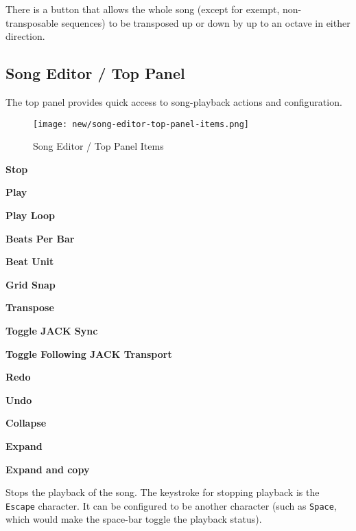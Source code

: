    There is a button that allows the whole song (except for
   exempt, non-transposable sequences) to be transposed up or down by up to an
   octave in either direction.

\subsection{Song Editor / Top Panel}
\label{subsec:seq64_song_editor_top}

   The top panel provides quick access to song-playback actions and
   configuration.

\begin{figure}[H]
   \centering 
   \texttt{[image: new/song-editor-top-panel-items.png]}
   \caption{Song Editor / Top Panel Items}
   \label{fig:song_editor_top_panel_items}
\end{figure}

   \begin{enumber}
      \item \textbf{Stop}
      \item \textbf{Play}
      \item \textbf{Play Loop}
      \item \textbf{Beats Per Bar}
      \item \textbf{Beat Unit}
      \item \textbf{Grid Snap}
      \item \textbf{Transpose}
      \item \textbf{Toggle JACK Sync}
      \item \textbf{Toggle Following JACK Transport}
      \item \textbf{Redo}
      \item \textbf{Undo}
      \item \textbf{Collapse}
      \item \textbf{Expand}
      \item \textbf{Expand and copy}
   \end{enumber}

   \setcounter{ItemCounter}{0}      %

   Stops the playback of the song.
   The keystroke for stopping playback is the \texttt{Escape} character.
   It can be configured to be another character (such as \texttt{Space}, which
   would make the space-bar toggle the playback status).

